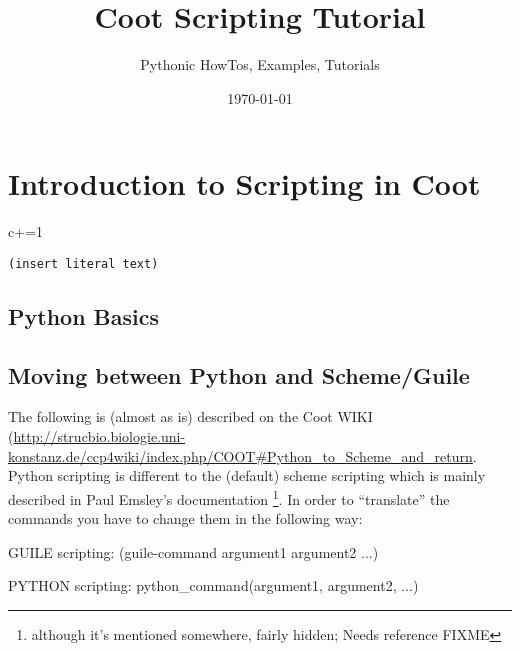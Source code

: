 \documentclass{article}
\title{Coot Scripting Tutorial}
\author{Pythonic HowTos, Examples, Tutorials}
\date{\today}
\begin{document}
\maketitle
\tableofcontents


\newpage

\section{Introduction to Scripting in Coot}

\begin{code}
  c+=1
\end{code}

\begin{verbatim}
(insert literal text)
\end{verbatim}

\subsection{Python Basics}

\subsection{Moving between Python and Scheme/Guile}
The following is (almost as is) described on the Coot WIKI (\url{http://strucbio.biologie.uni-konstanz.de/ccp4wiki/index.php/COOT#Python_to_Scheme_and_return}.
Python scripting is different to the (default) scheme scripting which is mainly described in Paul Emsley's documentation \footnote{although it's mentioned somewhere, fairly hidden; Needs reference FIXME}. In order to ``translate'' the commands you have to change them in the following way:

 GUILE scripting: (guile-command argument1 argument2 ...)

 PYTHON scripting: python\_command(argument1, argument2, ...)
\end{document}
